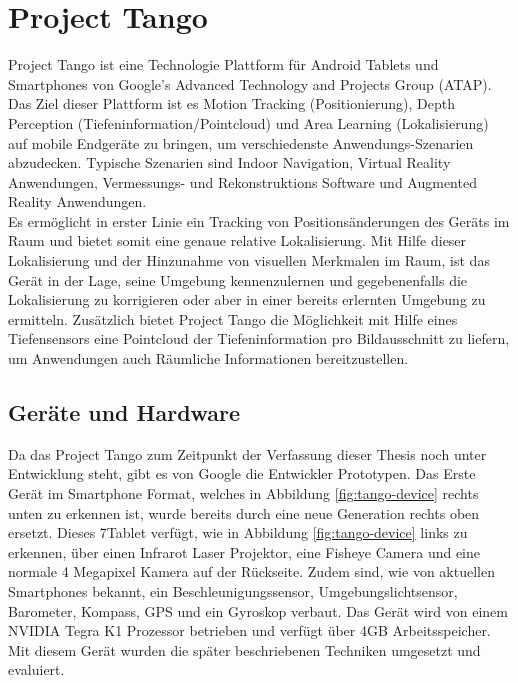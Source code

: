 
\section{Project Tango}

Project Tango ist eine Technologie Plattform für Android Tablets und Smartphones von Google’s Advanced Technology and Projects Group (ATAP). Das Ziel dieser Plattform ist es Motion Tracking (Positionierung), Depth Perception (Tiefeninformation/Pointcloud) und Area Learning (Lokalisierung) auf mobile Endgeräte zu bringen, um verschiedenste Anwendungs-Szenarien abzudecken. Typische Szenarien sind Indoor Navigation, Virtual Reality Anwendungen, Vermessungs- und Rekonstruktions Software und Augmented Reality Anwendungen.\\

Es ermöglicht in erster Linie ein Tracking von Positionsänderungen des Geräts im Raum und bietet somit eine genaue relative Lokalisierung. Mit Hilfe dieser Lokalisierung und der Hinzunahme von visuellen Merkmalen im Raum, ist das Gerät in der Lage, seine Umgebung kennenzulernen und gegebenenfalls die Lokalisierung zu korrigieren oder aber in einer bereits erlernten Umgebung zu ermitteln. Zusätzlich bietet Project Tango die Möglichkeit mit Hilfe eines Tiefensensors eine Pointcloud der Tiefeninformation pro Bildausschnitt zu liefern, um Anwendungen auch Räumliche Informationen bereitzustellen.  \citep{Proje19:online} \\

\subsection{Geräte und Hardware}

Da das Project Tango zum Zeitpunkt der Verfassung dieser Thesis noch unter Entwicklung steht, gibt es von Google die Entwickler Prototypen. Das Erste Gerät im Smartphone Format, welches in Abbildung \ref{fig:tango-device} rechts unten zu erkennen ist, wurde bereits durch eine neue Generation rechts oben ersetzt. Dieses 7\dq Tablet verfügt, wie in Abbildung \ref{fig:tango-device} links zu erkennen, über einen Infrarot Laser Projektor, eine Fisheye Camera und eine normale 4 Megapixel Kamera auf der Rückseite. Zudem sind, wie von aktuellen Smartphones bekannt, ein Beschleunigungssensor, Umgebungslichtsensor, Barometer, Kompass, GPS und ein Gyroskop verbaut. Das Gerät wird von einem NVIDIA Tegra K1 Prozessor betrieben und verfügt über 4GB Arbeitsspeicher. \citep{Proje19:online} Mit diesem Gerät wurden die später beschriebenen Techniken umgesetzt und evaluiert.  \\

